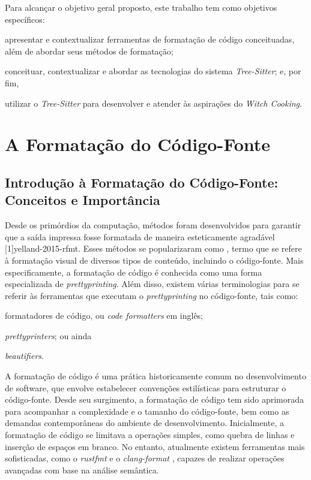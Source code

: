 \documentclass[11pt, a4paper, english, openright, twoside, brazil]{abntex2}
\begin{document}
  Para alcançar o objetivo geral proposto, este trabalho tem como objetivos
  específicos:
  \begin{inparaenum}
    \item apresentar e contextualizar ferramentas de formatação de código
          conceituadas, além de abordar seus métodos de formatação;
    \item conceituar, contextualizar e abordar as tecnologias do sistema
          \textit{Tree-Sitter}; e, por fim,
    \item utilizar o \textit{Tree-Sitter} para desenvolver e atender às
          aspirações do \textit{Witch Cooking}.
  \end{inparaenum}


  \chapter{A Formatação do Código-Fonte}

  \section{Introdução à Formatação do Código-Fonte: Conceitos e Importância}

  Desde os primórdios da computação, métodos foram desenvolvidos para garantir
  que a saída impressa fosse formatada de maneira esteticamente agradável
  [1]{yelland-2015-rfmt}. Esses métodos se
  popularizaram como \textit{}, termo que se refere à
  formatação visual de diversos tipos de conteúdo, incluindo o código-fonte.
  Mais especificamente, a formatação de código é conhecida como uma forma
  especializada de \textit{prettyprinting}. Além disso, existem várias
  terminologias para se referir às ferramentas que executam o
  \textit{prettyprinting} no código-fonte, tais como:
  \begin{inparaenum}
    \item formatadores de código, ou \textit{code formatters} em inglês;
    \item \textit{prettyprinters}; ou ainda
    \item \textit{beautifiers}.
  \end{inparaenum}

  A formatação de código é uma prática historicamente comum no desenvolvimento
  de software, que envolve estabelecer convenções estilísticas para estruturar
  o código-fonte. Desde seu surgimento, a formatação de código tem sido
  aprimorada para acompanhar a complexidade e o tamanho do código-fonte, bem
  como as demandas contemporâneas do ambiente de desenvolvimento. Inicialmente,
  a formatação de código se limitava a operações simples, como quebra de linhas
  e inserção de espaços em branco. No entanto, atualmente existem ferramentas
  mais sofisticadas, como o \textit{rustfmt} \cite{rust-lang-2023-rustfmt} e o
  \textit{clang-format} \cite{llvm-2023-clang}, capazes de realizar operações
  avançadas com base na análise semântica.
\end{document}
